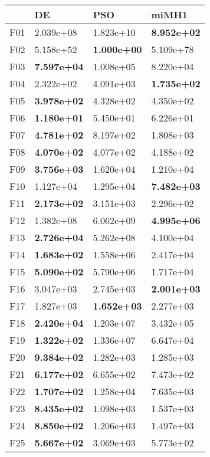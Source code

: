 \documentclass[10pt,a4paper]{article}
\begin{document}
\begin{table}[]
	\centering
	\begin{tabular}{|l|l|l|l|}
		\hline
		{} &         DE &        PSO &      miMH1 \\ \hline
		F01  &  2.039e+08 &  1.823e+10 &  \textbf{8.952e+02} \\
		F02  &  5.158e+52 &  \textbf{1.000e+00} &  5.109e+78 \\
		F03  &  \textbf{7.597e+04} &  1.008e+05 &  8.220e+04 \\
		F04  &  2.322e+02 &  4.091e+03 &  \textbf{1.735e+02} \\
		F05  &  \textbf{3.978e+02} &  4.328e+02 &  4.350e+02 \\
		F06  &  \textbf{1.180e+01} &  5.450e+01 &  6.226e+01 \\
		F07  &  \textbf{4.781e+02} &  8.197e+02 &  1.808e+03 \\
		F08  &  \textbf{4.070e+02} &  4.077e+02 &  4.188e+02 \\
		F09  &  \textbf{3.756e+03} &  1.620e+04 &  1.210e+04 \\
		F10  &  1.127e+04 &  1.295e+04 &  \textbf{7.482e+03} \\
		F11  &  \textbf{2.173e+02} &  3.151e+03 &  2.296e+02 \\
		F12  &  1.382e+08 &  6.062e+09 &  \textbf{4.995e+06} \\
		F13  &  \textbf{2.726e+04} &  5.262e+08 &  4.100e+04 \\
		F14  &  \textbf{1.683e+02} &  1.558e+06 &  2.417e+04 \\
		F15  &  \textbf{5.090e+02} &  5.790e+06 &  1.717e+04 \\
		F16  &  3.047e+03 &  2.745e+03 &  \textbf{2.001e+03} \\
		F17  &  1.827e+03 &  \textbf{1.652e+03} &  2.277e+03 \\
		F18  &  \textbf{2.420e+04} &  1.203e+07 &  3.432e+05 \\
		F19  &  \textbf{1.322e+02} &  1.336e+07 &  6.647e+04 \\
		F20  &  \textbf{9.384e+02} &  1.282e+03 &  1.285e+03 \\
		F21  &  \textbf{6.177e+02} &  6.655e+02 &  7.473e+02 \\
		F22  &  \textbf{1.707e+02} &  1.258e+04 &  7.635e+03 \\
		F23  &  \textbf{8.435e+02} &  1.098e+03 &  1.537e+03 \\
		F24  &  \textbf{8.850e+02} &  1.206e+03 &  1.497e+03 \\
		F25  &  \textbf{5.667e+02} &  3.069e+03 &  5.773e+02 \\

\end{tabular}
\end{table}
\end{document}
